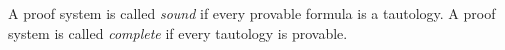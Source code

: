 

\setcounter{section}{2}
\setcounter{subsection}{1}
\setcounter{dfn}{2}

\begin{dfn}
A proof system is called \emph{sound} if every provable formula is a tautology.
A proof system is called \emph{complete} if every tautology is provable.
\end{dfn}



